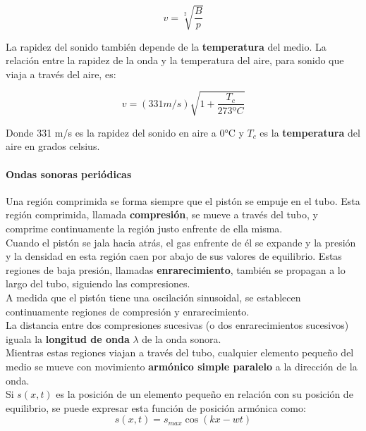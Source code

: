 \documentclass[10pt]{article}
\begin{document}
\begin{equation*}
	v = \sqrt[2]{\dfrac{B}{p}}
\end{equation*}

La rapidez del sonido también depende de la \textbf{temperatura} del medio. La relación entre
la rapidez de la onda y la temperatura del aire, para sonido que viaja a través del aire, es:

\begin{equation*}
	v = (331 m/s) \sqrt{1+\frac{T_c}{273ºC}}
\end{equation*}

Donde 331 m/s es la rapidez del sonido en aire a 0°C y $T_c$ es la \textbf{temperatura} del aire en grados celsius.

\paragraph{Ondas sonoras periódicas}
Una región comprimida se forma siempre que el pistón se empuje
en el tubo. Esta región comprimida, llamada \textbf{compresión}, se mueve a través del tubo, y
comprime continuamente la región justo enfrente de ella misma.\\
\linebreak
Cuando el pistón se jala hacia atrás, el gas enfrente de él se expande y la presión y la densidad en esta región caen
por abajo de sus valores de equilibrio. Estas regiones de baja presión, llamadas \textbf{enrarecimiento},
también se propagan a lo largo del tubo, siguiendo las compresiones.\\
A medida que el pistón tiene una oscilación sinusoidal, se establecen continuamente
regiones de compresión y enrarecimiento.\\
\linebreak 
La distancia entre dos compresiones sucesivas (o dos enrarecimientos sucesivos) iguala 
la \textbf{longitud de onda} $\lambda$ de la onda sonora.\\
\linebreak
Mientras estas regiones viajan a través del tubo, cualquier elemento pequeño del medio se mueve
con movimiento \textbf{armónico simple paralelo} a la dirección de la onda.\\
\linebreak
Si $s(x, t)$ es la posición de un elemento pequeño en relación con su posición de equilibrio,
 se puede expresar esta función de posición armónica como:
\begin{equation*}
 	s(x,t) = s_{max} \cos(kx-wt)
\end{equation*}
\end{document}

